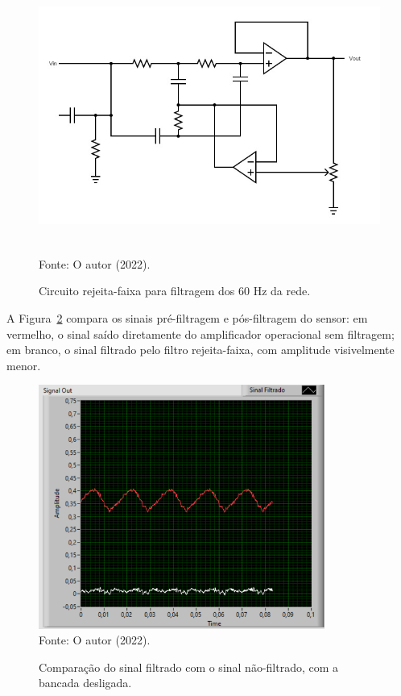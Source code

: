 \documentclass[
	12pt,				
	oneside,			
	a4paper,			
	english,			
	brazil,			
	]{abntex2ppgsi}
\begin{document}
\begin{figure}[H]
\centering
\caption {Circuito rejeita-faixa para filtragem dos 60 Hz da rede.}
\includegraphics[width=\textwidth,height=90mm,keepaspectratio]{circuito_notch} \\
Fonte: O autor (2022).
\label{circuito_notch}
\end{figure} 

A Figura~\ref{sinal_filtrado_maquina_desligada} compara os sinais pré-filtragem e pós-filtragem do sensor: em vermelho, o sinal saído diretamente do amplificador operacional sem filtragem; em branco, o sinal filtrado pelo filtro rejeita-faixa, com amplitude visivelmente menor.

\begin{figure}[H]
\centering
\caption {Comparação do sinal filtrado com o sinal não-filtrado, com a bancada desligada.}
\includegraphics[width=\textwidth,height=80mm,keepaspectratio]{GraficosAnalise/sinal_filtrado_maquina_desligada} \\
Fonte: O autor (2022).
\label{sinal_filtrado_maquina_desligada}
\end{figure} 
\end{document}
